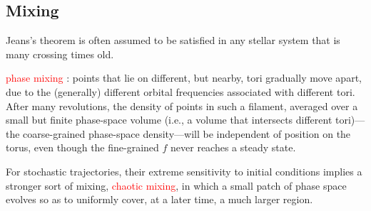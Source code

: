 \documentclass[12pt,a4paper]{article}
\newcounter{theo}[section]\setcounter{theo}{0}
\begin{document}
\subsection{Mixing}
Jeans's theorem is often assumed to be satisfied in any stellar system that is many crossing times old. 

\textcolor{red}{phase mixing} : points that lie on different, but nearby, tori gradually move apart, due to the (generally) different orbital frequencies associated with different tori. After many revolutions, the density of points in such a filament, averaged over a small but finite phase-space volume (i.e., a volume that intersects different tori)—the coarse-grained phase-space density---will be independent of position on the torus, even though the fine-grained $f$ never reaches a steady state.

For stochastic trajectories, their extreme sensitivity to initial conditions implies a stronger sort of mixing, \textcolor{red}{chaotic mixing}, in which a small patch of phase space evolves so as to uniformly cover, at a later time, a much larger region. 





\end{document}
